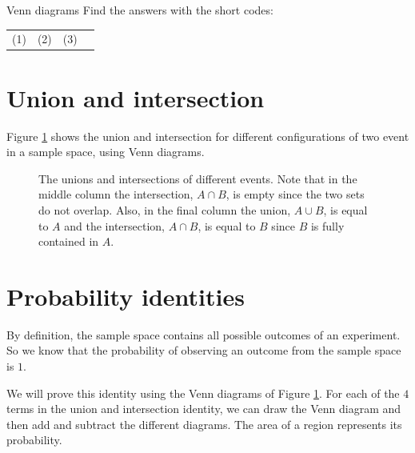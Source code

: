 \begin{exercises}{Venn diagrams}
  Find the answers with the short codes: \\
  \begin{tabularx}{\textwidth}{XXXX}
    (1) & (2) & (3) \\
  \end{tabularx}
\end{exercises}

\section{Union and intersection}


Figure \ref{fig:venn_union_intersection} shows the union and intersection for different
configurations of two event in a sample space, using Venn diagrams.

\begin{figure}[H]
  
  \caption{The unions and intersections of different events. Note that
    in the middle column the intersection, $A \cap B$, is empty since
    the two sets do not overlap. Also, in the final column the union,
    $A \cup B$, is equal to $A$ and the intersection, $A \cap B$, is
    equal to $B$ since $B$ is fully contained in $A$.}
  \label{fig:venn_union_intersection}
\end{figure}

\section{Probability identities}

By definition, the sample space contains all possible outcomes of an
experiment. So we know that the probability of observing an outcome
from the sample space is $1$.


We will prove this identity using the Venn diagrams of Figure
\ref{fig:venn_union_intersection}. For each of the $4$ terms in the
union and intersection identity, we can draw the Venn diagram and then
add and subtract the different diagrams. The area of a region
represents its probability.


